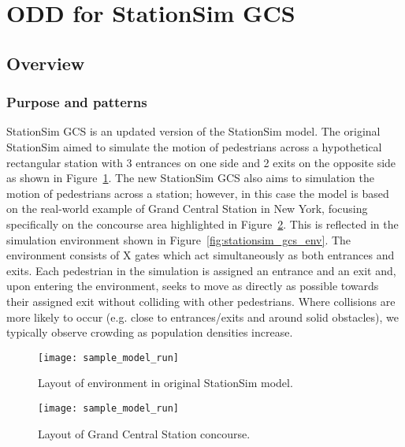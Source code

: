 \section{ODD for StationSim GCS}\label{sec:stationsim}

\subsection{Overview}\label{sub:stationsim:overview}

\subsubsection{Purpose and patterns}\label{subs:stationsim:overview:purpose}

StationSim GCS is an updated version of the StationSim model.
The original StationSim aimed to simulate the motion of pedestrians across a
hypothetical rectangular station with 3 entrances on one side and 2 exits on the
opposite side as shown in Figure~\ref{fig:stationsim_env}.
The new StationSim GCS also aims to simulation the motion of pedestrians across
a station; however, in this case the model is based on the real-world example of
Grand Central Station in New York, focusing specifically on the concourse area
highlighted in Figure~\ref{fig:gcs_concourse}.
This is reflected in the simulation environment shown in
Figure~\ref{fig:stationsim_gcs_env}.
The environment consists of X gates which act simultaneously as both entrances
and exits.
Each pedestrian in the simulation is assigned an entrance and an exit and, upon
entering the environment, seeks to move as directly as possible towards their
assigned exit without colliding with other pedestrians.
Where collisions are more likely to occur (e.g. close to entrances/exits and
around solid obstacles), we typically observe crowding as population densities
increase.


\begin{figure}[h]
    \centering
    \texttt{[image: sample\_model\_run]}
    \caption{Layout of environment in original StationSim
    model.}\label{fig:stationsim_env}
\end{figure}

\begin{figure}[h]
    \centering
    \texttt{[image: sample\_model\_run]}
    \caption{Layout of Grand Central Station
    concourse.}\label{fig:gcs_concourse}
\end{figure}

